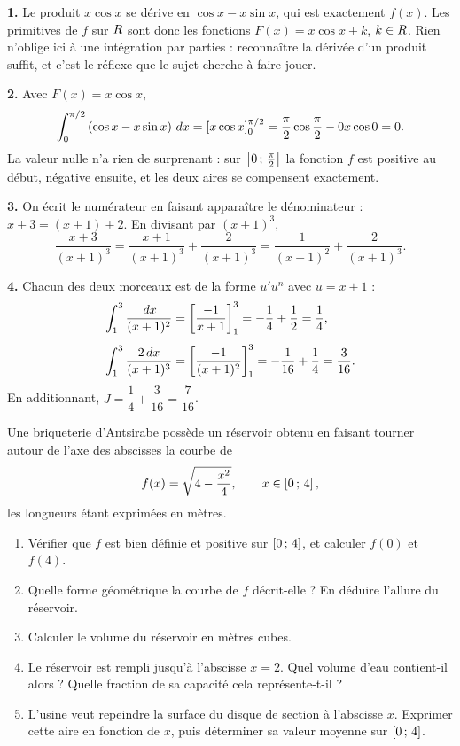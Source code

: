 \begin{corrige}[annales]
\textbf{1.} Le produit $x\cos x$ se dérive en $\cos x - x\sin x$, qui est
exactement $f(x)$. Les primitives de $f$ sur $R$ sont donc les fonctions
$F(x) = x\cos x + k$, $k\in R$. Rien n'oblige ici à une intégration par
parties : reconnaître la dérivée d'un produit suffit, et c'est le réflexe que
le sujet cherche à faire jouer.

\textbf{2.} Avec $F(x) = x\cos x$,
\[
  \int_{0}^{\pi/2}\left(\cos x - x\sin x\right)\,dx
  = \left[x\cos x\right]_{0}^{\pi/2}
  = \frac{\pi}{2}\cos\frac{\pi}{2} - 0x\cos 0
  = 0 .
\]
La valeur nulle n'a rien de surprenant : sur $\left[0\,;\,\frac{\pi}{2}\right]$
la fonction $f$ est positive au début, négative ensuite, et les deux aires se
compensent exactement.

\textbf{3.} On écrit le numérateur en faisant apparaître le dénominateur :
$x+3 = (x+1)+2$. En divisant par $(x+1)^{3}$,
\[
  \frac{x+3}{(x+1)^{3}} = \frac{x+1}{(x+1)^{3}} + \frac{2}{(x+1)^{3}}
  = \frac{1}{(x+1)^{2}} + \frac{2}{(x+1)^{3}} .
\]

\textbf{4.} Chacun des deux morceaux est de la forme $u'u^{n}$ avec
$u = x+1$ :
\[\begin{aligned}
\int_{1}^{3}\frac{\,dx}{(x+1)^{2}} &= \left[\frac{-1}{x+1}\right]_{1}^{3}
  = -\frac14+\frac12 = \frac14,
  \\[4pt]
  \int_{1}^{3}\frac{2\,dx}{(x+1)^{3}} &= \left[\frac{-1}{(x+1)^{2}}\right]_{1}^{3}
  = -\frac{1}{16}+\frac14 = \frac{3}{16}.
\end{aligned}\]
En additionnant, $J = \dfrac14+\dfrac{3}{16} = \dfrac{7}{16}$.
\end{corrige}

\begin{jecherche}
Une briqueterie d'Antsirabe possède un réservoir obtenu en faisant tourner
autour de l'axe des abscisses la courbe de
\[
  f(x) = \sqrt{4-\frac{x^{2}}{4}}, \qquad x \in \left[0\,;\,4\right],
\]
les longueurs étant exprimées en mètres.

\begin{enumerate}[label=\textbf{\arabic*.}, leftmargin=*, itemsep=0.3em]
  \item Vérifier que $f$ est bien définie et positive sur $\left[0\,;\,4\right]$,
        et calculer $f(0)$ et $f(4)$.
  \item Quelle forme géométrique la courbe de $f$ décrit-elle ? En déduire
        l'allure du réservoir.
  \item Calculer le volume du réservoir en mètres cubes.
  \item Le réservoir est rempli jusqu'à l'abscisse $x=2$. Quel volume d'eau
        contient-il alors ? Quelle fraction de sa capacité cela représente-t-il ?
  \item L'usine veut repeindre la surface du disque de section à l'abscisse
        $x$. Exprimer cette aire en fonction de $x$, puis déterminer sa valeur
        moyenne sur $\left[0\,;\,4\right]$.
\end{enumerate}
\end{jecherche}

